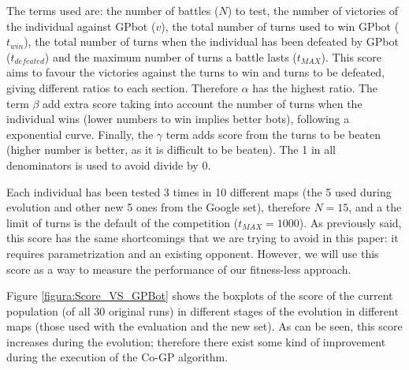 \documentclass[conference]{IEEEtran}
\begin{document}
The terms used are: the number of battles ($N$) to test, the number of victories of the individual against GPbot ($v$), the total number of turns used to win GPbot ($t_{win}$), the total number of turns when the individual has been defeated by GPbot ($t_{defeated}$) and the maximum number of turns a battle lasts ($t_{MAX}$). This score aims to favour the victories against the turns to win and turns to be defeated, giving different ratios to each section. Therefore $\alpha$ has the highest ratio. The term $\beta$ add extra score taking into account the number of turns when the individual wins (lower numbers to win implies better bots), following a exponential curve.
Finally, the $\gamma$ term adds score from the turns to be beaten (higher number is better, as it is difficult to be beaten). The 1 in all denominators is used to avoid divide by 0.

Each individual has been tested 3 times in 10 different maps (the 5 used during evolution and other new 5 ones from the Google set), therefore $N=15$, and a the limit of turns is the default of the competition ($t_{MAX}=1000$). As previously said, this score has the same shortcomings that we are trying to avoid in this paper: it requires parametrization and an existing opponent. However, we will use this score as a way to measure the performance of our fitness-less approach.

Figure \ref{figura:Score_VS_GPBot} shows the boxplots of the score of the current population (of all 30 original runs) in different stages of the evolution in different maps (those used  with the evaluation and the new set). As can be seen, this score increases during the evolution; therefore there exist some kind of improvement during the execution of the Co-GP algorithm.
\end{document}
